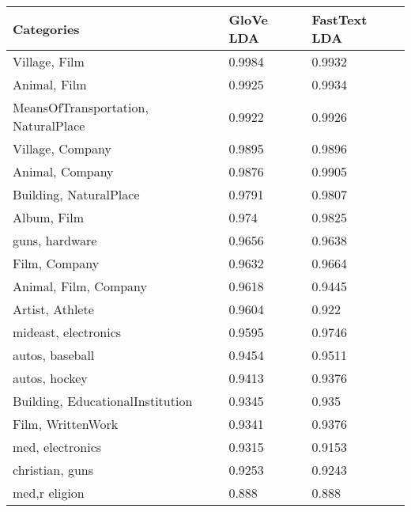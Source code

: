 \documentclass{article} %
\begin{document}
\begin{table}[]
\centering
\captionsetup{position=bottom}
\begin{tabular}{lll}
\toprule
Categories                      & GloVe LDA       & FastText LDA \\
\midrule
Village, Film                               & 0.9984       & 0.9932                 \\
Animal, Film                                & 0.9925       & 0.9934                 \\
MeansOfTransportation, NaturalPlace          & 0.9922       & 0.9926                 \\
Village, Company                            & 0.9895       & 0.9896                 \\
Animal, Company                             & 0.9876       & 0.9905                 \\
Building, NaturalPlace                      & 0.9791       & 0.9807                 \\
Album, Film                                 & 0.974        & 0.9825                 \\
guns, hardware                              & 0.9656       & 0.9638                 \\
Film, Company                               & 0.9632       & 0.9664                 \\
Animal, Film, Company                        & 0.9618       & 0.9445                 \\
Artist, Athlete                             & 0.9604       & 0.922                  \\
mideast, electronics                        & 0.9595       & 0.9746                 \\
autos, baseball                             & 0.9454       & 0.9511                 \\
autos, hockey                               & 0.9413       & 0.9376                 \\
Building, EducationalInstitution            & 0.9345       & 0.935                  \\
Film, WrittenWork                           & 0.9341       & 0.9376                 \\
med, electronics                            & 0.9315       & 0.9153                 \\
christian, guns                             & 0.9253       & 0.9243                 \\
med,r eligion                               & 0.888        & 0.888                  \\

\end{tabular}
\end{table}
\end{document}
